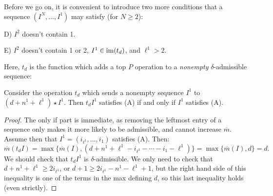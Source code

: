 \documentclass[11pt]{article}
\newcommand{\minDimP}{\overline{m}}
\begin{document}
\begin{CalculatingRepeatedKoszul}
Before we go on, it is convenient to introduce two more conditions that a sequence $(I^N,\ldots,I^1)$ may satisfy (for $N\geq2$):
\begin{itemise}
\setlength{\parindent}{.25in}
\item[D)] $I^2$ doesn't contain 1.
\item[E)] $I^2$ doesn't contain 1 or 2, $I^1\in\operatorname{im}(t_d)$, and $\ell^1>2$.
\end{itemise}
Here, $t_d$ is the function which adds a top $P$ operation to a \emph{nonempty} $\delta$-admissible sequence:
\begin{lem*}
Consider the operation $t_d$ which sends a nonempty sequence  $I^1$ to $(d+n^1+\ell^1)\star I^1$. Then $t_dI^1$ satisfies (A) if and only if $I^1$ satisfies (A).
\end{lem*}
\begin{proof}
The only if part is immediate, as removing the leftmost entry of a sequence only makes it more likely to be admissible, and cannot increase $\minDimP$. Assume then that $I^1=(i_{\ell^1},\ldots,i_1)$ satisfies (A). Then:%
\[\minDimP(t_dI)=\max\{\minDimP(I),(d+n^1+\ell^1-i_{\ell^1}-\cdots -i_1-\ell^1)\}=\max\{\minDimP(I),d\}=d.\]
We should check that $t_dI^1$ is $\delta$-admissible. We only need to check that $d+n^1+\ell^1\geq2i_{\ell^1}$, or $d+1\geq2i_{\ell^1}-n^1-\ell^1+1$, but the right hand side of this inequality is one of the terms in the max defining $d$, so this last inequality holds (even strictly).
\end{proof}

\begin{KoszulSequenceCombinatorics}

\end{KoszulSequenceCombinatorics}
\end{CalculatingRepeatedKoszul}
\end{document}

